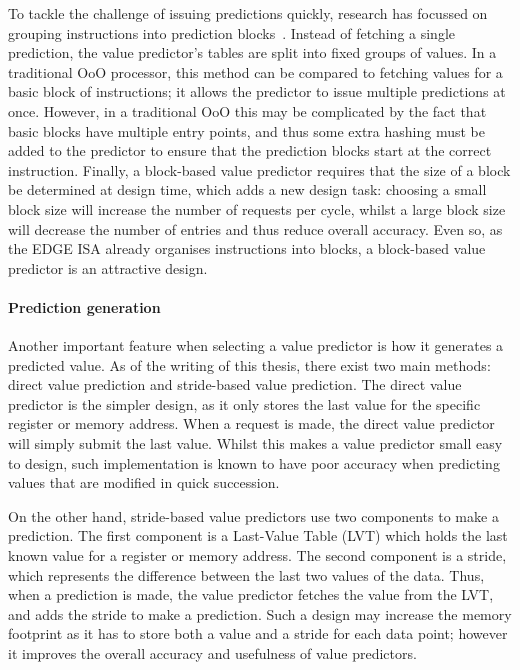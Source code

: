 To tackle the challenge of issuing predictions quickly, research has focussed on grouping instructions into prediction blocks~\cite{peraisBeBop2015}.
Instead of fetching a single prediction, the value predictor's tables are split into fixed groups of values.
In a traditional OoO processor, this method can be compared to fetching values for a basic block of instructions; it allows the predictor to issue multiple predictions at once.
However, in a traditional OoO this may be complicated by the fact that basic blocks have multiple entry points, and thus some extra hashing must be added to the predictor to ensure that the prediction blocks start at the correct instruction. %
Finally, a block-based value predictor requires that the size of a block be determined at design time, which adds a new design task: choosing a small block size will increase the number of requests per cycle, whilst a large block size will decrease the number of entries and thus reduce overall accuracy. %
Even so, as the EDGE ISA already organises instructions into blocks, a block-based value predictor is an attractive design.

\paragraph*{Prediction generation} Another important feature when selecting a value predictor is how it generates a predicted value.
As of the writing of this thesis, there exist two main methods: direct value prediction and stride-based value prediction.
The direct value predictor is the simpler design, as it only stores the last value for the specific register or memory address.
When a request is made, the direct value predictor will simply submit the last value.
Whilst this makes a value predictor small easy to design, such implementation is known to have poor accuracy when predicting values that are modified in quick succession.

On the other hand, stride-based value predictors use two components to make a prediction.
The first component is a Last-Value Table (LVT) which holds the last known value for a register or memory address.
The second component is a stride, which represents the difference between the last two values of the data.
Thus, when a prediction is made, the value predictor fetches the value from the LVT, and adds the stride to make a prediction.
Such a design may increase the memory footprint as it has to store both a value and a stride for each data point; however it improves the overall accuracy and usefulness of value predictors.

